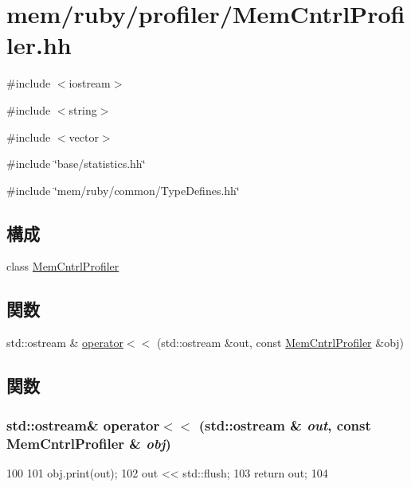 \hypertarget{MemCntrlProfiler_8hh}{
\section{mem/ruby/profiler/MemCntrlProfiler.hh}
\label{MemCntrlProfiler_8hh}
}
{\ttfamily \#include $<$iostream$>$}\par
{\ttfamily \#include $<$string$>$}\par
{\ttfamily \#include $<$vector$>$}\par
{\ttfamily \#include \char`\"{}base/statistics.hh\char`\"{}}\par
{\ttfamily \#include \char`\"{}mem/ruby/common/TypeDefines.hh\char`\"{}}\par
\subsection*{構成}
\begin{DoxyCompactItemize}
\item 
class \hyperlink{classMemCntrlProfiler}{MemCntrlProfiler}
\end{DoxyCompactItemize}
\subsection*{関数}
\begin{DoxyCompactItemize}
\item 
std::ostream \& \hyperlink{MemCntrlProfiler_8hh_a8a81d9004946838133fb4ef6e659b515}{operator$<$$<$} (std::ostream \&out, const \hyperlink{classMemCntrlProfiler}{MemCntrlProfiler} \&obj)
\end{DoxyCompactItemize}


\subsection{関数}
\hypertarget{MemCntrlProfiler_8hh_a8a81d9004946838133fb4ef6e659b515}{
\subsubsection[{operator$<$$<$}]{\setlength{\rightskip}{0pt plus 5cm}std::ostream\& operator$<$$<$ (std::ostream \& {\em out}, \/  const {\bf MemCntrlProfiler} \& {\em obj})}}
\label{MemCntrlProfiler_8hh_a8a81d9004946838133fb4ef6e659b515}



\begin{DoxyCode}
100 {
101     obj.print(out);
102     out << std::flush;
103     return out;
104 }
\end{DoxyCode}
